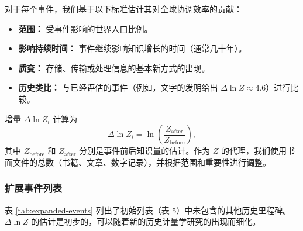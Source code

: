 \documentclass[12pt,a4paper]{article}
\theoremstyle{remark}
\begin{document}
		对于每个事件，我们基于以下标准估计其对全球协调效率的贡献：
		\begin{itemize}
			\item \textbf{范围：} 受事件影响的世界人口比例。
			\item \textbf{影响持续时间：} 事件继续影响知识增长的时间（通常几十年）。
			\item \textbf{质变：} 存储、传输或处理信息的基本新方式的出现。
			\item \textbf{历史类比：} 与已经评估的事件（例如，文字的发明给出 $\Delta \ln Z \approx 4.6$）进行比较。
		\end{itemize}
		增量 $\Delta \ln Z_i$ 计算为
		\[
		\Delta \ln Z_i = \ln\left(\frac{Z_{\text{after}}}{Z_{\text{before}}}\right),
		\]
		其中 $Z_{\text{before}}$ 和 $Z_{\text{after}}$ 分别是事件前后知识量的估计。作为 $Z$ 的代理，我们使用书面文件的总数（书籍、文章、数字记录），并根据范围和重要性进行调整。
		
		\subsubsection{扩展事件列表}
		
		表 \ref{tab:expanded-events} 列出了初始列表（表 5）中未包含的其他历史里程碑。$\Delta \ln Z$ 的估计是初步的，可以随着新的历史计量学研究的出现而细化。
		
\end{document}
